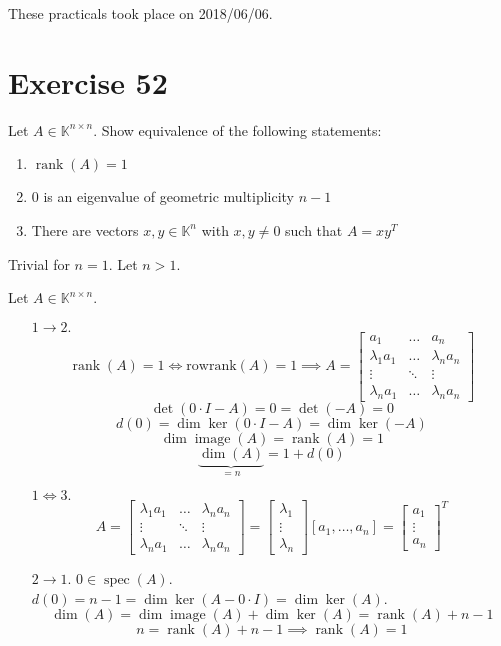 \documentclass[a4paper]{article}
\theoremstyle{definition}
\DeclareMathOperator\image{image}
\newcommand\dateref[1]{These practicals took place on #1.\par}
\DeclareMathOperator\rank{rank}
\begin{document}
\dateref{2018/06/06}

\section{Exercise 52}
\begin{ex}
  Let $A \in \mathbb K^{n \times n}$. Show equivalence of the following statements:
  \begin{enumerate}
    \item $\rank(A) = 1$
    \item $0$ is an eigenvalue of geometric multiplicity $n-1$
    \item There are vectors $x, y \in \mathbb K^n$ with $x, y \neq 0$ such that $A = xy^T$
  \end{enumerate}
\end{ex}

Trivial for $n = 1$. Let $n > 1$.

Let $A \in \mathbb K^{n \times n}$.
\begin{enumerate}
  \item[$1 \to 2.$]
    \[ \rank(A) = 1 \iff \text{rowrank}(A) = 1 \implies A = \begin{bmatrix} a_1 & \dots & a_n \\ \lambda_1 a_1 & \dots & \lambda_n a_n \\ \vdots & \ddots & \vdots \\ \lambda_n a_1 & \dots & \lambda_n a_n \end{bmatrix} \]
    \[ \det(0 \cdot I - A) = 0 = \det(-A) = 0 \]
    \[ d(0) = \dim\ker(0 \cdot I - A) = \dim\ker(-A) \]
    \[ \dim\image(A) = \rank(A) = 1 \]
    \[ \underbrace{\dim(A)}_{= n} = 1 + d(0) \]
  \item[$1 \iff 3.$]
    \[
      A
      = \begin{bmatrix} \lambda_1 a_1 & \dots & \lambda_n a_n \\ \vdots & \ddots & \vdots \\ \lambda_n a_1 & \dots & \lambda_n a_n \end{bmatrix}
      = \begin{bmatrix} \lambda_1 \\ \vdots \\ \lambda_n \end{bmatrix} [a_1, \dots, a_n]
      = \begin{bmatrix} a_1 \\ \vdots \\ a_n \end{bmatrix}^T
    \]
  \item[$2 \to 1.$]
    $0 \in \operatorname{spec}(A)$. $d(0) = n - 1 = \dim\ker(A - 0 \cdot I) = \dim\ker(A)$.
    \[ \dim(A) = \dim\image(A) + \dim\ker(A) = \rank(A) + n - 1 \]
    \[ n = \rank(A) + n - 1 \implies \rank(A) = 1 \]
\end{enumerate}
\end{document}
